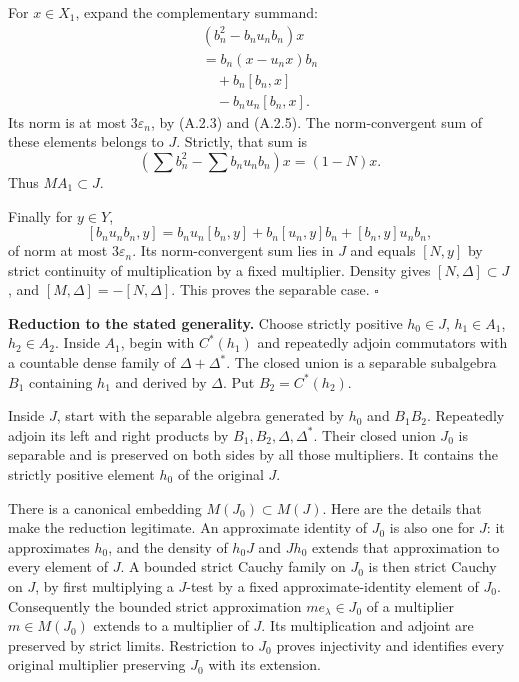\documentclass[
  11pt,
]{article}
\begin{document}
For \(x\in X_1\), expand the complementary summand: \[
\begin{gathered}
(b_n^2-b_nu_nb_n)x\\
 =b_n(x-u_nx)b_n\\
 \quad+b_n[b_n,x]\\
 \quad-b_nu_n[b_n,x].
\end{gathered}
\tag{A.2.11}
\] Its norm is at most \(3\varepsilon_n\), by (A.2.3) and (A.2.5). The
norm-convergent sum of these elements belongs to \(J\). Strictly, that
sum is \[
\left(\sum b_n^2-\sum b_nu_nb_n\right)x=(1-N)x.
\] Thus \(MA_1\subset J\).

Finally for \(y\in Y\), \[
[b_nu_nb_n,y]
=b_nu_n[b_n,y]+b_n[u_n,y]b_n+[b_n,y]u_nb_n,
\tag{A.2.12}
\] of norm at most \(3\varepsilon_n\). Its norm-convergent sum lies in
\(J\) and equals \([N,y]\) by strict continuity of multiplication by a
fixed multiplier. Density gives \([N,\Delta]\subset J\), and
\([M,\Delta]=-[N,\Delta]\). This proves the separable case. \(\square\)

\textbf{Reduction to the stated generality.} Choose strictly positive
\(h_0\in J\), \(h_1\in A_1\), \(h_2\in A_2\). Inside \(A_1\), begin with
\(C^*(h_1)\) and repeatedly adjoin commutators with a countable dense
family of \(\Delta+\Delta^*\). The closed union is a separable
subalgebra \(B_1\) containing \(h_1\) and derived by \(\Delta\). Put
\(B_2=C^*(h_2)\).

Inside \(J\), start with the separable algebra generated by \(h_0\) and
\(B_1B_2\). Repeatedly adjoin its left and right products by
\(B_1,B_2,\Delta,\Delta^*\). Their closed union \(J_0\) is separable and
is preserved on both sides by all those multipliers. It contains the
strictly positive element \(h_0\) of the original \(J\).

There is a canonical embedding \(M(J_0)\subset M(J)\). Here are the
details that make the reduction legitimate. An approximate identity of
\(J_0\) is also one for \(J\): it approximates \(h_0\), and the density
of \(h_0J\) and \(Jh_0\) extends that approximation to every element of
\(J\). A bounded strict Cauchy family on \(J_0\) is then strict Cauchy
on \(J\), by first multiplying a \(J\)-test by a fixed
approximate-identity element of \(J_0\). Consequently the bounded strict
approximation \(me_\lambda\in J_0\) of a multiplier \(m\in M(J_0)\)
extends to a multiplier of \(J\). Its multiplication and adjoint are
preserved by strict limits. Restriction to \(J_0\) proves injectivity
and identifies every original multiplier preserving \(J_0\) with its
extension.
\end{document}
